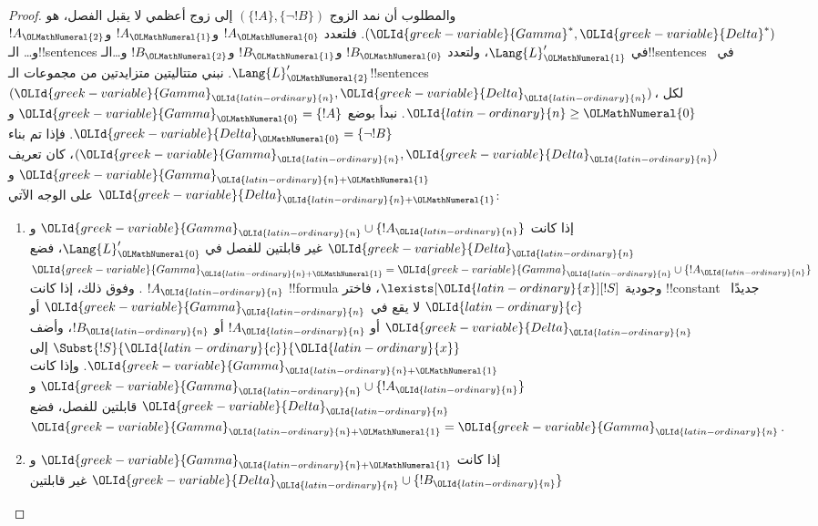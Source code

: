 \documentclass[../../../include/open-logic-section]{subfiles}
\begin{document}
\begin{proof}
والمطلوب أن نمد الزوج $(\{!A\},\{\lnot!B\})$ إلى زوج أعظمي لا يقبل الفصل،
هو $({\OLId{greek-variable}{Gamma}}^*,{\OLId{greek-variable}{Delta}}^*)$. فلتعدد $!A_{\OLMathNumeral{0}}$ و$!A_{\OLMathNumeral{1}}$ و$!A_{\OLMathNumeral{2}}$ و\dots
الـ!!{sentence}s في $\Lang{L}'_{\OLMathNumeral{1}}$، ولتعدد $!B_{\OLMathNumeral{0}}$ و$!B_{\OLMathNumeral{1}}$ و$!B_{\OLMathNumeral{2}}$
و\dots الـ!!{sentence}s في~$\Lang{L}'_{\OLMathNumeral{2}}$. نبني متتاليتين متزايدتين من
مجموعات الـ!!{sentence}s $({\OLId{greek-variable}{Gamma}}_{\OLId{latin-ordinary}{n}},{\OLId{greek-variable}{Delta}}_{\OLId{latin-ordinary}{n}})$، لكل ${\OLId{latin-ordinary}{n}} \ge {\OLMathNumeral{0}}$.
نبدأ بوضع ${\OLId{greek-variable}{Gamma}}_{\OLMathNumeral{0}}=\{!A\}$ و${\OLId{greek-variable}{Delta}}_{\OLMathNumeral{0}}=\{\lnot !B\}$. فإذا تم بناء
$({\OLId{greek-variable}{Gamma}}_{\OLId{latin-ordinary}{n}},{\OLId{greek-variable}{Delta}}_{\OLId{latin-ordinary}{n}})$، كان تعريف ${\OLId{greek-variable}{Gamma}}_{{\OLId{latin-ordinary}{n}}+{\OLMathNumeral{1}}}$ و${\OLId{greek-variable}{Delta}}_{{\OLId{latin-ordinary}{n}}+{\OLMathNumeral{1}}}$
على الوجه الآتي:
\begin{enumerate}
\item إذا كانت ${\OLId{greek-variable}{Gamma}}_{\OLId{latin-ordinary}{n}} \cup \{!A_{\OLId{latin-ordinary}{n}}\}$ و${\OLId{greek-variable}{Delta}}_{\OLId{latin-ordinary}{n}}$ غير قابلتين
  للفصل في $\Lang{L}'_{\OLMathNumeral{0}}$، فضع
  ${\OLId{greek-variable}{Gamma}}_{{\OLId{latin-ordinary}{n}}+{\OLMathNumeral{1}}}={\OLId{greek-variable}{Gamma}}_{\OLId{latin-ordinary}{n}} \cup \{!A_{\OLId{latin-ordinary}{n}}\}$. وفوق ذلك، إذا كانت $!A_{\OLId{latin-ordinary}{n}}$
  !!{formula} وجودية $\lexists[{\OLId{latin-ordinary}{x}}][!S]$، فاختر !!{constant} جديدًا~${\OLId{latin-ordinary}{c}}$
  لا يقع في ${\OLId{greek-variable}{Gamma}}_{\OLId{latin-ordinary}{n}}$ أو ${\OLId{greek-variable}{Delta}}_{\OLId{latin-ordinary}{n}}$ أو $!A_{\OLId{latin-ordinary}{n}}$ أو $!B_{\OLId{latin-ordinary}{n}}$، وأضف
  $\Subst{!S}{{\OLId{latin-ordinary}{c}}}{{\OLId{latin-ordinary}{x}}}$ إلى ${\OLId{greek-variable}{Gamma}}_{{\OLId{latin-ordinary}{n}}+{\OLMathNumeral{1}}}$. وإذا كانت
  ${\OLId{greek-variable}{Gamma}}_{\OLId{latin-ordinary}{n}} \cup \{!A_{\OLId{latin-ordinary}{n}}\}$ و${\OLId{greek-variable}{Delta}}_{\OLId{latin-ordinary}{n}}$ قابلتين للفصل، فضع
  ${\OLId{greek-variable}{Gamma}}_{{\OLId{latin-ordinary}{n}}+{\OLMathNumeral{1}}}={\OLId{greek-variable}{Gamma}}_{\OLId{latin-ordinary}{n}}$.
\item إذا كانت ${\OLId{greek-variable}{Gamma}}_{{\OLId{latin-ordinary}{n}}+{\OLMathNumeral{1}}}$ و${\OLId{greek-variable}{Delta}}_{\OLId{latin-ordinary}{n}} \cup \{!B_{\OLId{latin-ordinary}{n}}\}$ غير قابلتين

\end{enumerate}
\end{proof}
\end{document}
